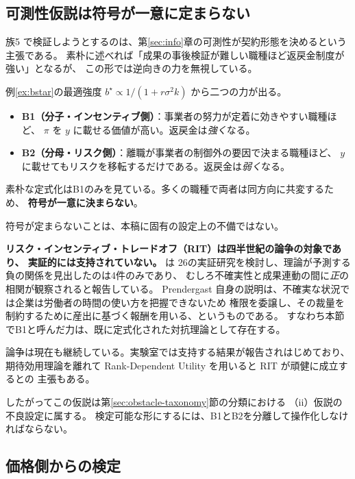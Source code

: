 \subsection{可測性仮説は符号が一意に定まらない}
\label{sec:predB-illposed}

族5 で検証しようとするのは、第\ref{sec:info}章の可測性が契約形態を決めるという主張である。
素朴に述べれば「成果の事後検証が難しい職種ほど返戻金制度が強い」となるが、
この形では逆向きの力を無視している。

例\ref{ex:bstar}の最適強度 $b^\star \propto 1/(1+r\sigma^2 k)$ から二つの力が出る。

\begin{itemize}
\item \textbf{B1（分子・インセンティブ側）}：事業者の努力が定着に効きやすい職種ほど、
$\pi$ を $y$ に載せる価値が高い。返戻金は\emph{強く}なる。
\item \textbf{B2（分母・リスク側）}：離職が事業者の制御外の要因で決まる職種ほど、
$y$ に載せてもリスクを移転するだけである。返戻金は\emph{弱く}なる。
\end{itemize}

素朴な定式化はB1のみを見ている。多くの職種で両者は同方向に共変するため、
\textbf{符号が一意に決まらない}。

\begin{remark}[これは分野全体の未解決問題である]
符号が定まらないことは、本稿に固有の設定上の不備ではない。

\textbf{リスク・インセンティブ・トレードオフ（RIT）は四半世紀の論争の対象であり、
実証的には支持されていない。} \cite{prendergast1999,prendergast2002} は
26の実証研究を検討し、理論が予測する負の関係を見出したのは4件のみであり、
むしろ不確実性と成果連動の間に\emph{正}の相関が観察されると報告している。
Prendergast 自身の説明は、不確実な状況では企業は労働者の時間の使い方を把握できないため
権限を委譲し、その裁量を制約するために産出に基づく報酬を用いる、というものである。
すなわち本節でB1と呼んだ力は、既に定式化された対抗理論として存在する。

論争は現在も継続している。実験室では支持する結果が報告されはじめており、
期待効用理論を離れて Rank-Dependent Utility を用いると RIT が頑健に成立するとの
主張もある。

したがってこの仮説は第\ref{sec:obstacle-taxonomy}節の分類における
（ii）仮説の不良設定に属する。
検定可能な形にするには、B1とB2を分離して操作化しなければならない。
\end{remark}

\subsection{価格側からの検定}
\label{sec:what-to-measure}

